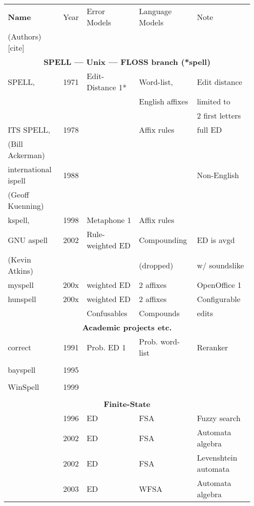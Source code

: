 \documentclass[officiallayout]{unihelcompling}
\begin{document}
\begin{table}
    \centering
    \begin{tiny}
    \begin{tabular}{|l|r|l|l|l|}
        \hline
        \bf Name & Year & Error Models & Language Models & Note \\
(Authors) [cite] & & & & \\
        \hline
        \multicolumn{5}{|c|}{\bf SPELL --- Unix --- FLOSS branch (*spell) }\\
        \hline
             SPELL, & 1971 & Edit-Distance 1* & Word-list, & Edit distance \\
\citep{gorin1971spell} &  & & English affixes & limited to \\
                                  &  & &              & 2 first letters \\
        ITS SPELL, & 1978 &  & Affix rules & full ED \\
     (Bill Ackerman) & & & & \\
        international ispell & 1988 & & & Non-English \\
              (Geoff Kuenning) & & & & \\
        \hline
        kspell, & 1998 & Metaphone 1 & Affix rules & \\
        GNU aspell & 2002 & Rule-weighted ED & Compounding & ED is avgd \\
    (Kevin Atkins) & & & (dropped) & w/ soundslike \\
        \hline
        myspell & 200x & weighted ED & 2 affixes & OpenOffice 1 \\
        \hline
        hunspell & 200x & weighted ED & 2 affixes & Configurable \\
                 &      & Confusables & Compounds & edits \\
        \hline
        \multicolumn{5}{|c|}{\bf Academic projects etc.} \\
        \hline
        correct & 1991 & Prob. ED 1 & Prob. word-list & Reranker \\
        \citep{church1991probability} & & & & \\
        \hline
        bayspell  & 1995 \\
        \citep{golding1995bayesian} \\
        \hline
        WinSpell & 1999 \\
        \citep{golding1999winnow} & \\
        \hline
        \multicolumn{5}{|c|}{\bf Finite-State} \\
        \hline
      \citep{oflazer1996errortolerant} & 1996 & ED & FSA & Fuzzy search\\
\citep{agata2002typographical} & 2002 & ED & FSA & Automata algebra \\
      \citep{schulz2002fast} & 2002 & ED & FSA & Levenshtein automata \\
        \citep{mohri2003edit} & 2003 & ED & WFSA & Automata algebra \\


\end{tabular}
\end{tiny}
\end{table}
\end{document}
